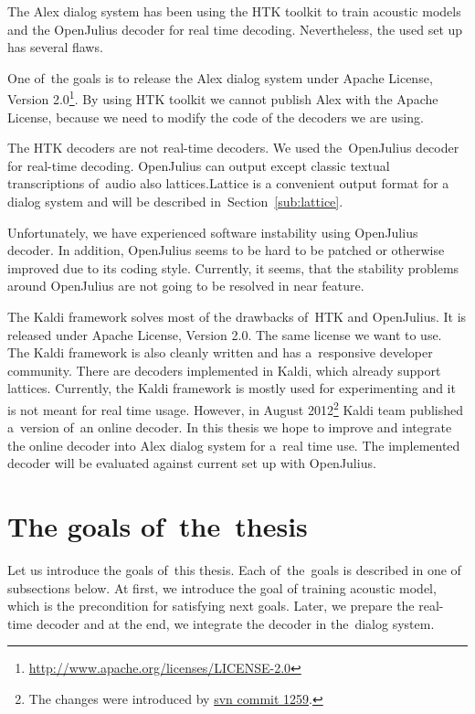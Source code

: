 The Alex dialog system has been using the \ac{HTK} toolkit\cite{young94htk} to train acoustic models and 
the OpenJulius\cite{lee2009julius} decoder for real time decoding. Nevertheless, the used set up has several flaws.

One of~the goals is to release the Alex dialog system under 
Apache License, Version 2.0\footnote{\url{http://www.apache.org/licenses/LICENSE-2.0}}. 
By using \ac{HTK} toolkit we cannot publish Alex with the Apache License, 
because we need to modify the code of the decoders we are using. 

The \ac{HTK} decoders are not real-time decoders\cite{yao2010practical}. 
We used the~OpenJulius decoder for real-time decoding. OpenJulius can output except classic textual transcriptions of~audio
also lattices.Lattice is a convenient output format for a dialog system and will be described in~Section~\ref{sub:lattice}.

Unfortunately, we have experienced software instability using OpenJulius decoder.  
In addition, OpenJulius seems to be hard to be patched or otherwise improved due to its coding style. 
Currently, it seems, that the stability problems around OpenJulius are not going to be resolved in near feature.

The Kaldi\cite{povey2011kaldi} framework solves most of the drawbacks of~\ac{HTK} and OpenJulius. 
It is released under Apache License, Version 2.0. The same license we want to use. 
The Kaldi framework is also cleanly written and has a~responsive developer community. 
There are decoders implemented in Kaldi, which already support lattices. 
Currently, the Kaldi framework is mostly used for experimenting and it is not meant for real time usage. 
However, in August 2012\footnote{The changes were introduced 
by \href{https://sourceforge.net/p/kaldi/code/1259/}{svn commit 1259}.} Kaldi team published a~version of~an online decoder. 
In this thesis we hope to improve and integrate the online decoder into Alex dialog system for a~real time use.
The implemented decoder will be evaluated against current set up with OpenJulius.


\section{The goals of~the~thesis} 
\label{sec:goals}
Let us introduce the goals of~this thesis. Each of~the~goals is described in one of subsections below.
At first, we introduce the goal of training acoustic model, which is the precondition for satisfying next goals.
Later, we prepare the real-time decoder and at the end, we integrate the decoder in the~dialog system. 

